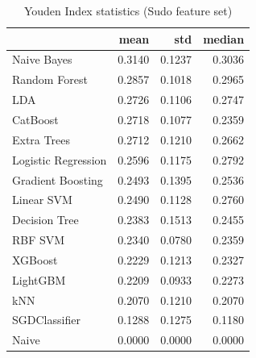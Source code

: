 \begin{table}
\caption{Youden Index statistics (Sudo feature set)}
\label{tab:youden_Sudo_stats}
\begin{tabular}{lrrr}
\toprule
 & mean & std & median \\
\midrule
Naive Bayes & 0.3140 & 0.1237 & 0.3036 \\
Random Forest & 0.2857 & 0.1018 & 0.2965 \\
LDA & 0.2726 & 0.1106 & 0.2747 \\
CatBoost & 0.2718 & 0.1077 & 0.2359 \\
Extra Trees & 0.2712 & 0.1210 & 0.2662 \\
Logistic Regression & 0.2596 & 0.1175 & 0.2792 \\
Gradient Boosting & 0.2493 & 0.1395 & 0.2536 \\
Linear SVM & 0.2490 & 0.1128 & 0.2760 \\
Decision Tree & 0.2383 & 0.1513 & 0.2455 \\
RBF SVM & 0.2340 & 0.0780 & 0.2359 \\
XGBoost & 0.2229 & 0.1213 & 0.2327 \\
LightGBM & 0.2209 & 0.0933 & 0.2273 \\
kNN & 0.2070 & 0.1210 & 0.2070 \\
SGDClassifier & 0.1288 & 0.1275 & 0.1180 \\
Naive & 0.0000 & 0.0000 & 0.0000 \\
\bottomrule
\end{tabular}
\end{table}
